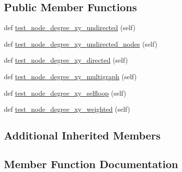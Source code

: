 \subsection*{Public Member Functions}
\begin{DoxyCompactItemize}
\item 
def \hyperlink{classnetworkx_1_1algorithms_1_1assortativity_1_1tests_1_1test__pairs_1_1TestDegreeMixingXY_aef899674543b1100452d7f31aa7d34ee}{test\+\_\+node\+\_\+degree\+\_\+xy\+\_\+undirected} (self)
\item 
def \hyperlink{classnetworkx_1_1algorithms_1_1assortativity_1_1tests_1_1test__pairs_1_1TestDegreeMixingXY_abf2573ede6e97657a610748eabc54332}{test\+\_\+node\+\_\+degree\+\_\+xy\+\_\+undirected\+\_\+nodes} (self)
\item 
def \hyperlink{classnetworkx_1_1algorithms_1_1assortativity_1_1tests_1_1test__pairs_1_1TestDegreeMixingXY_a3b722f79087ebf22f72381736b21ba94}{test\+\_\+node\+\_\+degree\+\_\+xy\+\_\+directed} (self)
\item 
def \hyperlink{classnetworkx_1_1algorithms_1_1assortativity_1_1tests_1_1test__pairs_1_1TestDegreeMixingXY_a6733bded12ab845fb450d9a038df0efd}{test\+\_\+node\+\_\+degree\+\_\+xy\+\_\+multigraph} (self)
\item 
def \hyperlink{classnetworkx_1_1algorithms_1_1assortativity_1_1tests_1_1test__pairs_1_1TestDegreeMixingXY_ac8a1e3ae69f4a665ffbf92bf8ec27eb4}{test\+\_\+node\+\_\+degree\+\_\+xy\+\_\+selfloop} (self)
\item 
def \hyperlink{classnetworkx_1_1algorithms_1_1assortativity_1_1tests_1_1test__pairs_1_1TestDegreeMixingXY_af8e2126af2b5dfc502610d1cd779bcd2}{test\+\_\+node\+\_\+degree\+\_\+xy\+\_\+weighted} (self)
\end{DoxyCompactItemize}
\subsection*{Additional Inherited Members}


\subsection{Member Function Documentation}
\mbox{\label{classnetworkx_1_1algorithms_1_1assortativity_1_1tests_1_1test__pairs_1_1TestDegreeMixingXY_a3b722f79087ebf22f72381736b21ba94}} 
